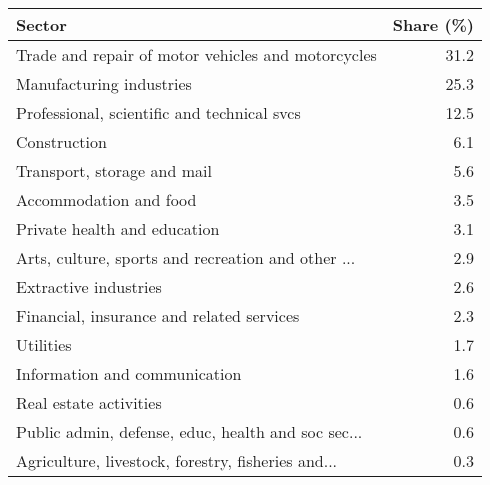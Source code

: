 \begin{tabular}{lr}
\toprule
                                            Sector &  Share (\%) \\
\midrule
Trade and repair of motor vehicles and motorcycles &       31.2 \\
                          Manufacturing industries &       25.3 \\
       Professional, scientific and technical svcs &       12.5 \\
                                      Construction &        6.1 \\
                       Transport, storage and mail &        5.6 \\
                            Accommodation and food &        3.5 \\
                      Private health and education &        3.1 \\
Arts, culture, sports and recreation and other ... &        2.9 \\
                             Extractive industries &        2.6 \\
         Financial, insurance and related services &        2.3 \\
                                         Utilities &        1.7 \\
                     Information and communication &        1.6 \\
                            Real estate activities &        0.6 \\
Public admin, defense, educ, health and soc sec... &        0.6 \\
Agriculture, livestock, forestry, fisheries and... &        0.3 \\
\bottomrule
\end{tabular}
